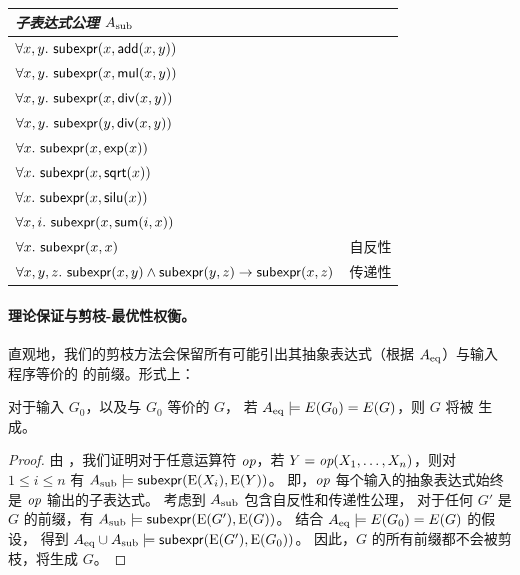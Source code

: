 \begin{table}[h]
{\begin{tabular}{l|l}
    \midrule
    \multicolumn{2}{l}{\it 子表达式公理 $A_\text{sub}$} \\
    \midrule
    $\forall x,y.\ \subexpr(x, \eadd(x, y))$ & \\
    $\forall x,y.\ \subexpr(x, \emul(x, y))$ & \\
    $\forall x,y.\ \subexpr(x, \ediv(x, y))$ & \\
    $\forall x,y.\ \subexpr(y, \ediv(x, y))$ & \\
    $\forall x.\ \subexpr(x, \eexp(x))$ & \\
    $\forall x.\ \subexpr(x, \esqrt(x))$ & \\
    $\forall x.\ \subexpr(x, \esilu(x))$ & \\
    $\forall x,i.\ \subexpr(x, \ered(i, x))$ & \\
    $\forall x.\ \subexpr(x, x)$ & 自反性 \\
    $\forall x,y,z.\ \subexpr(x,y) \wedge \subexpr(y,z) \to \subexpr(x, z)$ & 传递性 \\
    \bottomrule
    \end{tabular}
    }
    \vspace{\captionvspace}
\end{table}

\paragraph{理论保证与剪枝-最优性权衡。}
直观地，我们的剪枝方法会保留所有可能引出其抽象表达式（根据 $A_\text{eq}$）与输入 \lax 程序等价的 \graph 的前缀。形式上：

\begin{theorem}[通过抽象表达式剪枝]
\label{thm:pruning}
对于输入 \graph $G_0$，以及与 $G_0$ 等价的 \graph $G$，
若 $A_\text{eq} \models E(G_0) = E(G)$，则 $G$ 将被  生成。
\end{theorem}

\begin{proof}
由 ，我们证明对于任意运算符 $\mbox{\rm\em op}$，若 $Y = \mbox{\rm\em op}(X_1,\ldots,X_n)$，则对 $1 \leq i \leq n$ 有 $A_\text{sub} \models \mathsf{subexpr}(\mathrm{E}(X_i), \mathrm{E}(Y))$。
即，$\mbox{\rm\em op}$ 每个输入的抽象表达式始终是 $\mbox{\rm\em op}$ 输出的子表达式。
考虑到 $A_\text{sub}$ 包含自反性和传递性公理，
对于任何 $G'$ 是 $G$ 的前缀，有 $A_\text{sub} \models \mathsf{subexpr}(\mathrm{E}(G'),\mathrm{E}(G))$。
结合 $A_\text{eq} \models E(G_0) = E(G)$ 的假设，
得到 $A_\text{eq} \cup A_\text{sub} \models \mathsf{subexpr}(\mathrm{E}(G'),\mathrm{E}(G_0))$。
因此，$G$ 的所有前缀都不会被剪枝，\sys 将生成 $G$。
\end{proof}
